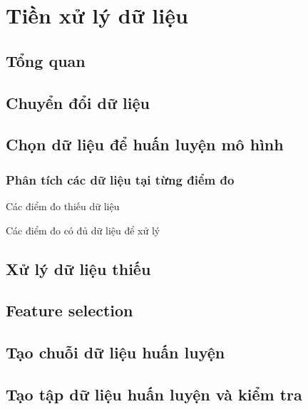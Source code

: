 
\section{Tiền xử lý dữ liệu}
\subsection{Tổng quan}
\subsection{Chuyển đổi dữ liệu}
\subsection{Chọn dữ liệu để huấn luyện mô hình}
\subsubsection{Phân tích các dữ liệu tại từng điểm đo}
Các điểm đo thiếu dữ liệu

Các điểm đo có đủ dữ liệu để xử lý


\subsection{Xử lý dữ liệu thiếu}
\subsection{Feature selection}
\subsection{Tạo chuỗi dữ liệu huấn luyện}
\subsection{Tạo tập dữ liệu huấn luyện và kiểm tra}

